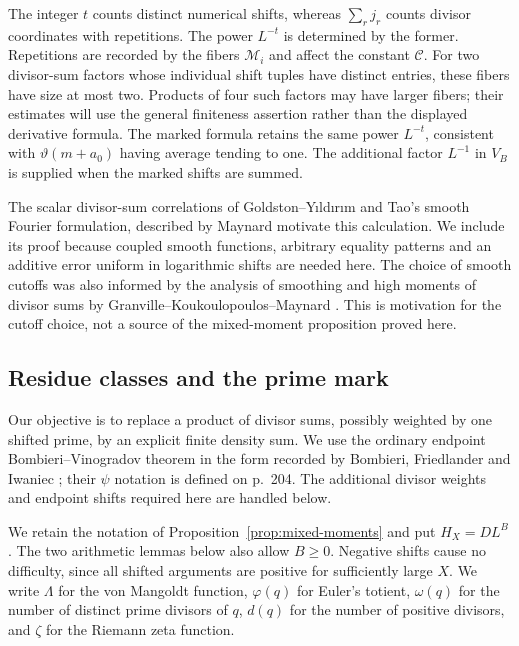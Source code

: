 The integer $t$ counts distinct numerical shifts, whereas
$\sum_r j_r$ counts divisor coordinates with repetitions. The power
$L^{-t}$ is determined by the former. Repetitions are recorded by the
fibers $\mathcal M_i$ and affect the constant $\mathcal C$. For two
divisor-sum factors whose individual shift tuples have distinct entries,
these fibers have size at most two. Products of four such factors
may have larger fibers; their estimates will use the general
finiteness assertion rather than the displayed derivative formula.
The marked formula retains the same power $L^{-t}$, consistent with
$\vartheta(m+a_0)$ having average tending to one. The additional factor
$L^{-1}$ in $V_B$ is supplied when the marked shifts are summed.

The scalar divisor-sum correlations of Goldston--Y{\i}ld{\i}r{\i}m
\cite{GoldstonYildirim2003Triple,GY2005} and Tao's smooth Fourier formulation,
described by Maynard \cite[Section~6, p.~404]{Maynard2015} motivate this calculation. We include its
proof because coupled smooth functions, arbitrary equality patterns and
an additive error uniform in logarithmic shifts are needed here.
The choice of smooth cutoffs was also informed by the analysis of
smoothing and high moments of divisor sums by
Granville--Koukoulopoulos--Maynard \cite{GKM2021}.  This is motivation
for the cutoff choice, not a source of the mixed-moment proposition
proved here.

\subsection{Residue classes and the prime mark}
Our objective is to replace a product of divisor sums, possibly weighted by one shifted prime, by an explicit finite density sum. We use the ordinary endpoint Bombieri--Vinogradov theorem in the form recorded by Bombieri, Friedlander and Iwaniec \cite[p.~206, equation~(1.4)]{BFI1986}; their $\psi$ notation is defined on p.~204. The additional divisor weights and endpoint shifts required here are handled below.

We retain the notation of Proposition~\ref{prop:mixed-moments} and put
$H_X=DL^B$. The two arithmetic lemmas below also allow $B\ge0$.
Negative shifts cause no difficulty, since all shifted arguments are
positive for sufficiently large $X$.
We write $\Lambda$ for the von Mangoldt function, $\varphi(q)$ for Euler's
totient, $\omega(q)$ for the number of distinct prime divisors of $q$,
$d(q)$ for the number of positive divisors, and $\zeta$ for the Riemann
zeta function.

